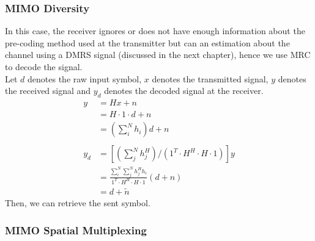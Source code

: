 \subsubsection{MIMO Diversity}
In this case, the receiver ignores or does not have enough information about the pre-coding method used at the transmitter but can an estimation about the channel using a DMRS signal (discussed in the next chapter), hence we use MRC to decode the signal. \\
Let $d$ denotes the raw input symbol, $x$ denotes the transmitted signal, $y$ denotes the received signal and $y_d$ denotes the decoded signal at the receiver.
\begin{equation}
    \label{eq: MIMO div using MRC}
    \begin{aligned}
        y &= Hx + n \\
        &= H \cdot 1 \cdot d + n \\
        &= \left( \sum_i^N h_i \right) d + n \\
        \\
        y_d &= \left[ \left( \sum_j^N h^H_j \right) / \left( 1^T \cdot H^H \cdot H \cdot 1 \right) \right] y \\
        &= \frac{ \sum_i^N \sum_j^N h^H_j h_i }{1^T \cdot H^H \cdot H \cdot 1} (d + n) \\
        &= d + \tilde{n}
    \end{aligned}
\end{equation}
Then, we can retrieve the sent symbol.
\subsubsection{MIMO Spatial Multiplexing}
